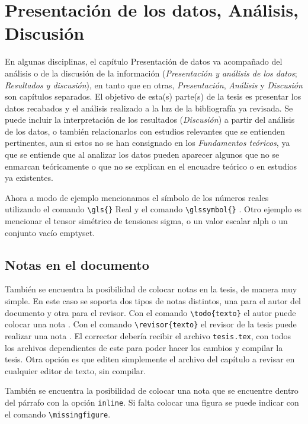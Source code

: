 \chapter{Presentación de los datos, Análisis, Discusión}

En algunas disciplinas, el capítulo Presentación de datos va acompañado del análisis o de la discusión de la información (\textit{Presentación y análisis de los datos}; \textit{Resultados y discusión}), en tanto que en otras, \textit{Presentación}, \textit{Análisis} y \textit{Discusión} son capítulos separados.
El objetivo de esta(s) parte(s) de la tesis es presentar los datos recabados y el análisis realizado a la luz de la bibliografía ya revisada. Se puede incluir la interpretación de los resultados (\textit{Discusión}) a partir del análisis de los datos, o también relacionarlos con estudios relevantes que se entienden pertinentes, aun si estos no se han consignado en los \textit{Fundamentos teóricos}, ya que se entiende que al analizar los datos pueden aparecer algunos que no se enmarcan teóricamente o que no se explican en el encuadre teórico o en estudios ya existentes.

Ahora a modo de ejemplo mencionamos el símbolo de los números reales utilizando el comando \verb|\gls{}| \gls{Real} y el comando \verb|\glssymbol{}| . Otro ejemplo es mencionar el tensor simétrico de tensiones \gls{sigma}, o un valor escalar  \gls{alph} o un conjunto vacío \gls{emptyset}.

\newpage 
\section{Notas en el documento}

También se encuentra la posibilidad de colocar notas en la tesis, de manera muy simple. En este caso se soporta dos tipos de notas distintos,  una para el autor del documento y otra para el revisor. Con el comando \verb|\todo{texto}| el autor puede colocar una nota . Con el comando \verb|\revisor{texto}| el revisor de la tesis puede realizar una nota . El corrector debería recibir el archivo \verb|tesis.tex|, con todos los archivos dependientes de este para poder hacer los cambios   y compilar la tesis. Otra opción es que editen simplemente el archivo del capítulo a revisar en cualquier editor de texto, sin compilar.

También se encuentra la posibilidad de colocar una nota que se encuentre dentro del párrafo con la opción \verb|inline|.  
Si falta colocar una figura se puede indicar con el comando \verb|\missingfigure|.

